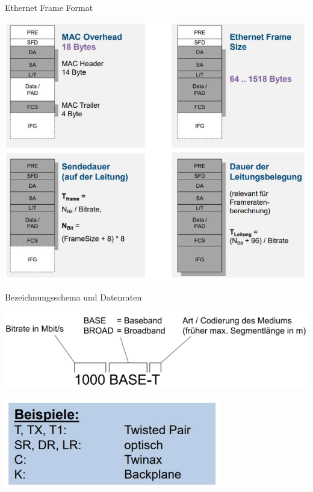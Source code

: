 \begin{definition}{Ethernet Frame Format}
\begin{minipage}{0.3\linewidth}
    \end{minipage}
    \begin{minipage}{0.7\linewidth}
        \includegraphics[width=1\linewidth]{images/ethernet_frame_details.png}
    \end{minipage}     
\end{definition}

\begin{theorem}{Bezeichnungsschema und Datenraten}\\
    \begin{minipage}{0.65\linewidth}
        \includegraphics[width=1\linewidth]{images/ethernet_bezeichnungsschema.png}
    \end{minipage}
    \begin{minipage}{0.3\linewidth}
        \includegraphics[width=1\linewidth]{images/ethernet_bsp_bezeichnung.png}
    \end{minipage}
\end{theorem}

